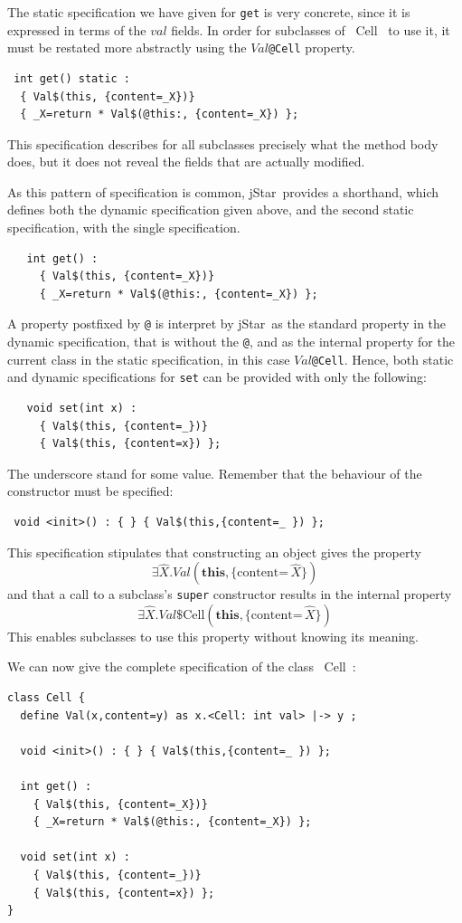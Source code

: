 \documentclass[11pt]{article}
\newcommand{\jStar}{{\sf jStar}}
\newcommand{\Val}{\mathit{Val}}
\newcommand{\ex}[1]{\mathord{\hat{#1}}}
\newcommand{\content}[1]{\{\text{content=} \, #1 \}}
\newcommand{\this}{\mathbf{this}}
\def\J{\lstinline}
\newcommand{\JS}[1]{$\mathit{#1}$}
\begin{document}
The static specification we have given for \J~get~ is very concrete, since it is expressed in terms of the 
$val$ fields.  In order for subclasses of \JS~Cell~ 
 to use it, it must be restated more abstractly using the \JS{Val}\J~@Cell~ property.
\begin{verbatim}
 int get() static : 
  { Val$(this, {content=_X})} 
  { _X=return * Val$(@this:, {content=_X}) };
 \end{verbatim}
This specification describes for all subclasses precisely what the method body
does, but it does not reveal the fields that are actually modified.

As this pattern of specification is common, \jStar \ provides a shorthand,
which defines both the dynamic specification given above, and the second
static specification, with the single specification.
%
\begin{verbatim}
   int get() : 
     { Val$(this, {content=_X})} 
     { _X=return * Val$(@this:, {content=_X}) };
\end{verbatim}
%
A property postfixed by \J~@~ is interpret by \jStar \ as the
standard property in the dynamic specification, that is without the
\J~@~, and as the internal property for the current class in the
static specification, in this case \JS{Val}\J~@Cell~.
%
Hence, both static and dynamic specifications for \J~set~  can be provided with only the following: 
\begin{verbatim}
   void set(int x) : 
     { Val$(this, {content=_})} 
     { Val$(this, {content=x}) };
\end{verbatim}
 The underscore stand for some value.
Remember that the behaviour of the constructor must be specified:
%
\begin{verbatim}
 void <init>() : { } { Val$(this,{content=_ }) };
\end{verbatim}
This specification stipulates that constructing an object gives the property
$$\exists \ex X.\Val(\this,\content{\ex X})$$ and that a call to a subclass's \J~super~
constructor results in the internal property
$$\exists \ex X.\Val\mbox{\$Cell}(\this,\content{\ex X})$$  This enables subclasses
to use this property without knowing its meaning.

We can now give the complete specification of the class \JS~Cell~:
\begin{verbatim}
class Cell {
  define Val(x,content=y) as x.<Cell: int val> |-> y ;

  void <init>() : { } { Val$(this,{content=_ }) };
  
  int get() : 
    { Val$(this, {content=_X})} 
    { _X=return * Val$(@this:, {content=_X}) };

  void set(int x) : 
    { Val$(this, {content=_})} 
    { Val$(this, {content=x}) };
}
\end{verbatim}
\end{document}
